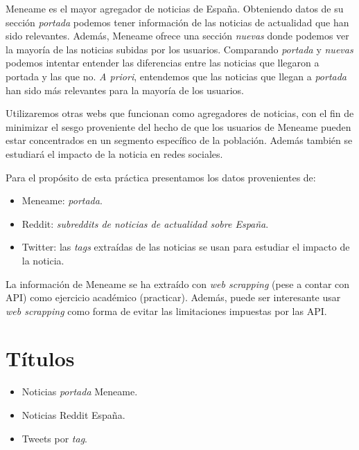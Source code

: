 \documentclass[a4paper,12pt]{article}
\begin{document}
Meneame es el mayor agregador de noticias de Espa\~na. Obteniendo datos de su secci\'on {\itshape portada} podemos tener informaci\'on de las noticias de actualidad que han sido relevantes. Adem\'as, Meneame ofrece una secci\'on {\itshape nuevas} donde podemos ver  la mayor\'ia de las noticias subidas por los usuarios. Comparando {\itshape portada} y {\itshape nuevas} podemos intentar entender las diferencias entre las noticias que llegaron a portada y las que no. {\itshape A priori}, entendemos que las noticias que llegan a {\itshape portada}  han sido m\'as relevantes para la mayor\'ia de los usuarios.

Utilizaremos otras webs que funcionan como agregadores de noticias, con el fin de minimizar el sesgo proveniente del hecho de que los usuarios de Meneame pueden estar concentrados en un segmento espec\'ifico de la poblaci\'on. Adem\'as tambi\'en se estudiar\'a el impacto de la noticia en redes sociales.

Para el prop\'osito de esta pr\'actica presentamos los datos provenientes de:

\begin{itemize}
\item Meneame: {\itshape portada}.
\item Reddit: {\itshape subreddits de noticias de actualidad sobre Espa\~na}.
\item Twitter: las {\itshape tags} extra\'idas de las noticias se usan para estudiar el impacto de la noticia. 

\end{itemize}

La informaci\'on de Meneame se ha extra\'ido con {\itshape web scrapping} (pese a contar con API) como ejercicio acad\'emico (practicar). Adem\'as, puede ser interesante usar  {\itshape web scrapping} como forma de evitar las limitaciones impuestas por las API.

\section[item_titulo]{T\'itulos}


\begin{itemize}

\item Noticias {\itshape portada} Meneame.
\item Noticias Reddit Espa\~na.
\item Tweets por {\itshape tag}.


\end{itemize}
\end{document}
